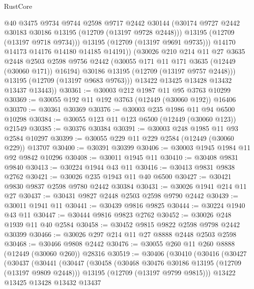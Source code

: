 \begin{lexlean}{RustCore}
\begin{coremodule}
                  @40
                  @3475
                  @9734
                  @9744
                  @2598
                  @9717
                  @2442
                  @30144
                  (@30174 @9727 @2442 @30183 @30186 @13195 (@12709 (@13197 @9728 @2448)))
                  @13195
                  (@12709 (@13197 @9718 @9734)))
                @13195
                (@12709 (@13197 @9691 @9735)))
              @14170
              @14173
              @14176
              @14180
              @14185
              @14191))
          (@30026
            @210
            @214
            @11
            @27
            @3635
            @2448
            @2503
            @2598
            @9756
            @2442
            (@30055 @171 @11 @171 @3635 (@12449 (@30060 @171)) @16194)
            @30186
            @13195
            (@12709 (@13197 @9757 @2448)))
          @13195
          (@12709 (@13197 @9683 @9763)))
        @13422
        @13425
        @13428
        @13432
        @13437
        @13443))
@30361 := @30003 @212 @1987 @11 @95 @3763 @10299
@30369 := @30055 @192 @11 @192 @3763 (@12449 (@30060 @192)) @16406
@30370 := @30361 @30369
@30376 := @30003 @235 @1986 @11 @94 @6500 @10298
@30384 := @30055 @123 @11 @123 @6500 (@12449 (@30060 @123)) @21549
@30385 := @30376 @30384
@30391 := @30003 @248 @1985 @11 @93 @2584 @10297
@30399 := @30055 @229 @11 @229 @2584 (@12449 (@30060 @229)) @13707
@30400 := @30391 @30399
@30406 := @30003 @1945 @1984 @11 @92 @9842 @10296
@30408 := @30011 @1945 @11
@30410 := @30408 @9831 @9840
@30413 := @30224 @1944 @43 @11
@30416 := @30413 @9831 @9838 @2762
@30421 := @30026 @235 @1943 @11 @40 @6500
@30427 := @30421 @9830 @9837 @2598 @9780 @2442 @30384
@30431 := @30026 @1941 @214 @11 @27
@30437 := @30431 @9827 @2448 @2503 @2598 @9790 @2442
@30439 := @30011 @1941 @11
@30441 := @30439 @9816 @9825
@30444 := @30224 @1940 @43 @11
@30447 := @30444 @9816 @9823 @2762
@30452 := @30026 @248 @1939 @11 @40 @2584
@30458 := @30452 @9815 @9822 @2598 @9798 @2442 @30399
@30466 := @30026 @297 @214 @11 @27 @8888 @2448 @2503 @2598
@30468 := @30466 @9808 @2442
@30476 := @30055 @260 @11 @260 @8888 (@12449 (@30060 @260)) @28316
@30519 := @30406
    (@30410
      (@30416
        (@30427
          (@30437
            (@30441
              (@30447
                (@30458
                  (@30468 @30476 @30186 @13195 (@12709 (@13197 @9809 @2448)))
                  @13195
                  (@12709 (@13197 @9799 @9815)))
                @13422
                @13425
                @13428
                @13432
                @13437

\end{coremodule}
\end{lexlean}
